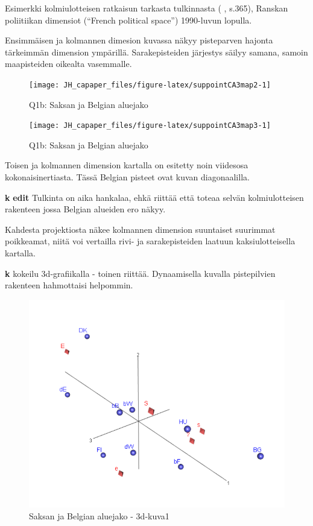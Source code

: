 \documentclass[
  finnish,
]{book}
\begin{document}
Esimerkki kolmiulotteisen ratkaisun tarkasta tulkinnasta ( \citet{RefWorks:doc:5a857a43e4b0ed2d44664d75} , s.365),
Ranskan poliitiikan dimensiot (``French political space'') 1990-luvun lopulla.

Ensimmäisen ja kolmannen dimesion kuvassa näkyy pisteparven hajonta tärkeimmän
dimension ympärillä. Sarakepisteiden järjestys säilyy samana, samoin maapisteiden
oikealta vasemmalle.

\begin{figure}

{\centering \texttt{[image: JH\_capaper\_files/figure-latex/suppointCA3map2-1]} 

}

\caption{Q1b: Saksan ja  Belgian aluejako }\label{fig:suppointCA3map2}
\end{figure}

\begin{figure}

{\centering \texttt{[image: JH\_capaper\_files/figure-latex/suppointCA3map3-1]} 

}

\caption{Q1b: Saksan ja  Belgian aluejako }\label{fig:suppointCA3map3}
\end{figure}

Toisen ja kolmannen dimension kartalla on esitetty noin viidesosa kokonaisinertiasta.
Tässä Belgian pisteet ovat kuvan diagonaalilla.

\textbf{k} \textbf{edit} Tulkinta on aika hankalaa, ehkä riittää että toteaa selvän
kolmiulotteisen rakenteen jossa Belgian alueiden ero näkyy.

Kahdesta projektiosta näkee kolmannen dimension suuntaiset suurimmat poikkeamat,
niitä voi vertailla rivi- ja sarakepisteiden laatuun kaksiulotteisella kartalla.

\textbf{k} kokeilu 3d-grafiikalla - toinen riittää. Dynaamisella kuvalla pistepilvien
rakenteen hahmottaisi helpommin.

\begin{figure}

{\centering \includegraphics[width=0.9\linewidth]{img/3dSymMap_1} 

}

\caption{Saksan ja  Belgian aluejako - 3d-kuva1}\label{fig:3dklippi1}
\end{figure}
\end{document}
